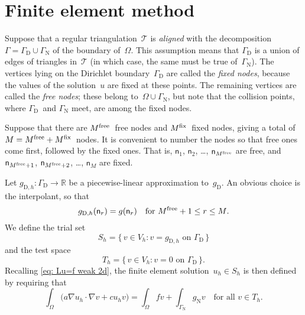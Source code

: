 \section{Finite element method}

Suppose that a regular triangulation~$\mathcal{T}$ is \emph{aligned} with 
the decomposition $\Gamma=\Gamma_{\mathrm{D}}\cup\Gamma_{\mathrm{N}}$ of the 
boundary of~$\Omega$.  This assumption means that $\Gamma_{\mathrm{D}}$ 
is a union of edges of triangles in~$\mathcal{T}$ (in which 
case, the same must be true of~$\Gamma_{\mathrm{N}}$).  The vertices lying on 
the Dirichlet boundary~$\Gamma_{\mathrm{D}}$ are called the \emph{fixed nodes}, 
because the values of the solution~$u$ are fixed at these points.  The 
remaining vertices are called the \emph{free nodes}; these belong 
to~$\Omega\cup\Gamma_{\mathrm{N}}$, but note that the collision points, where
$\Gamma_{\mathrm{D}}$~and $\Gamma_{\mathrm{N}}$ meet, are among the fixed nodes.

Suppose that there are $M^{\mathrm{free}}$~free nodes and $M^{\mathrm{fix}}$~fixed nodes, giving a 
total of $M=M^{\mathrm{free}}+M^{\mathrm{fix}}$~nodes. It is convenient to number the nodes so that 
free ones come first, followed by the fixed ones. That is, $\mathsf{n}_1$, 
$\mathsf{n}_2$, \dots, $\mathsf{n}_{M^{\mathrm{free}}}$ are free, and 
$\mathsf{n}_{M^{\mathrm{free}}+1}$, $\mathsf{n}_{M^{\mathrm{free}}+2}$, \dots, $\mathsf{n}_M$ are 
fixed.  

Let $g_{\mathrm{D},h}:\Gamma_{\mathrm{D}}\to\mathbb{R}$ be a piecewise-linear 
approximation to~$g_{\mathrm{D}}$.  An obvious choice is the interpolant, so
that
\[
g_{\mathrm{D},h}(\mathsf{n}_r)=g(\mathsf{n}_r)
    \quad\text{for $M^{\mathrm{free}}+1\le r\le M$.}
\]
We define the trial set
\[
S_h=\{\,v\in V_h:\text{$v=g_{\mathrm{D},h}$ on $\Gamma_{\mathrm{D}}$}\,\}
\]
and the test space
\[
T_h=\{\,v\in V_h:\text{$v=0$ on $\Gamma_{\mathrm{D}}$}\,\}.
\]
Recalling \eqref{eq: Lu=f weak 2d}, the finite element 
solution~$u_h\in S_h$ is then defined by requiring that
\begin{equation}\label{eq: FEM 2d}
\int_\Omega\bigl(a\nabla u_h\cdot\nabla v+cu_hv\bigr)=\int_\Omega fv
	+\int_{\Gamma_{\mathrm{N}}}g_{\mathrm{N}}v
	\quad\text{for all $v\in T_h$.}
\end{equation}

